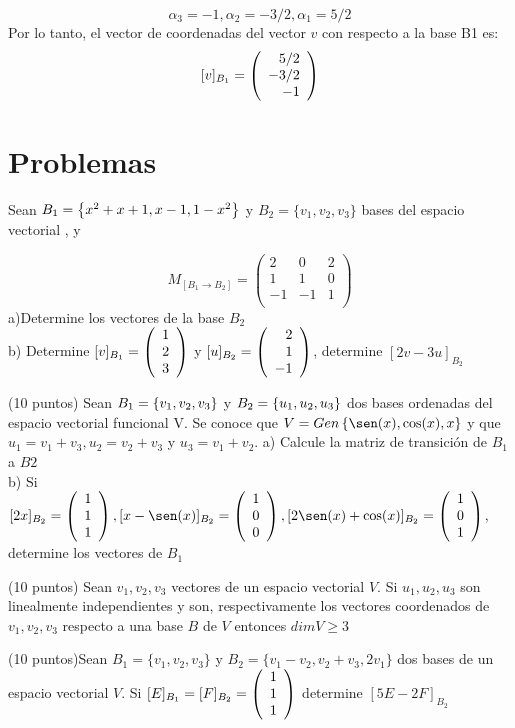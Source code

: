\begin{ejercicio}
\[\alpha_3=-1, \alpha_2=-3/2, \alpha_1=5/2\]
Por lo tanto, el vector de coordenadas del vector $v$ con respecto a la base B1 es:
\[[v]_{B_1}=\left( \begin{array}{r} 5/2\\ -3/2\\ -1 \end{array} \right) \]


\end{ejercicio}

\section{Problemas}
\begin{enumerate}

\begin{prob}[]

Sean $B_1= \left\{x^2+x+1, x-1, 1-x^2 \right\} $ y $B_2=\{v_1, v_2, v_3\}$ bases del espacio vectorial \pdos, y 

\[M_{[B_1 \rightarrow B_2]}=\left(\begin{array}{rrr}
2&0&2\\
1&1&0\\
-1&-1&1\\
\end{array}\right)\]
a)Determine los vectores de la base $B_2$
~\\b) Determine $[v]_{B_1}=\left( \begin{array}{r} 1\\ 2\\ 3 \end{array} \right) $ y $[u]_{B_2}=\left( \begin{array}{r} 2\\ 1\\ -1 \end{array} \right) $, determine $[2v-3u]_{B_2}$
\end{prob}

\begin{prob}
(10 puntos) Sean $B_1= \left\{v_1, v_2, v_3 \right\} $ y $B_2= \left\{u_1, u_2, u_3 \right\} $ dos bases ordenadas del espacio vectorial funcional V. Se conoce que $V=Gen\llav{\sen(x), \cos(x), x}$ y que $u_1=v_1+v_3, u_2=v_2+v_3 $ y $u_3= v_1+v_2$.
a) Calcule la matriz de transición de $B_1$ a $B2$ ~\\
b) Si $[2x]_{B_2}=\vectrtres{1}{1}{1}, [x-\sen(x)]_{B_2}=\vectrtres{1}{0}{0}, [2\sen(x)+\cos(x)]_{B_2}=\vectrtres{1}{0}{1}$, determine los vectores de $B_1$
\end{prob}



\begin{prob}
(10 puntos) Sean $v_1, v_2, v_3 $ vectores de un espacio vectorial $V$. Si $u_1, u_2, u_3 $ son linealmente independientes y son, respectivamente los vectores coordenados de $ v_1, v_2, v_3$ respecto a una base $ B $ de $V$ entonces $dim V \geq 3 $
\end{prob}
\newpage
\begin{prob}
(10 puntos)Sean $B_1=\{v_1, v_2, v_3\}$ y $B_2=\{v_1-v_2, v_2+v_3, 2v_1\}$ dos bases de un espacio vectorial $V$. Si $[E]_{B_1}=[F]_{B_2}=\left( \begin{array}{r} 1\\ 1\\ 1 \end{array} \right) $ determine $[5E-2F]_{B_2}$
\end{prob}

\end{enumerate}